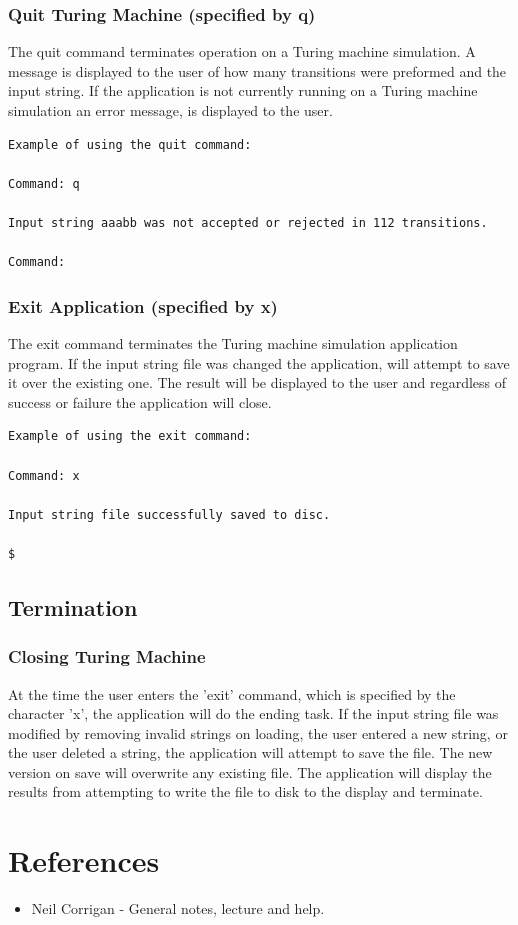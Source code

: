 \documentclass{report}
\begin{document}
\subsection{Quit Turing Machine (specified by q)} 

The quit command terminates operation on a Turing machine simulation. A message is displayed to the user of how many transitions were preformed and the input string. If the application is not currently running on a Turing machine simulation an error message, is displayed to the user.

\begin{verbatim}
Example of using the quit command:

Command: q

Input string aaabb was not accepted or rejected in 112 transitions.

Command: 
\end{verbatim}

\subsection{Exit Application (specified by x)} 
 The exit command terminates the Turing machine simulation application program. If the input string file was changed the application, will attempt to save it over the existing one. The result will be displayed to the user and regardless of success or failure the application will close.
 
\begin{verbatim}
Example of using the exit command:

Command: x

Input string file successfully saved to disc.

$ 
\end{verbatim}

\section{Termination}

\subsection{Closing Turing Machine} 
At the time the user enters the 'exit' command, which is specified by the character 'x', the application will do the ending task. If the input string file was modified by removing invalid strings on loading, the user entered a new string, or the user deleted a string, the application will attempt to save the file. The new version on save will overwrite any existing file. The application will display the results from attempting to write the file to disk to the display and terminate.
 

\chapter{References}

\begin{itemize}
\item Neil Corrigan - General notes, lecture and help.
\end{itemize}

 

 
\end{document}

